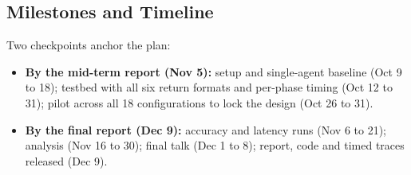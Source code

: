 \documentclass[11pt]{article}
\begin{document}
\subsection{Milestones and Timeline}
Two checkpoints anchor the plan:
\begin{itemize}
  \item \textbf{By the mid-term report (Nov 5):} setup and single-agent baseline (Oct 9 to 18); testbed with all six return formats and per-phase timing (Oct 12 to 31); pilot across all 18 configurations to lock the design (Oct 26 to 31).
  \item \textbf{By the final report (Dec 9):} accuracy and latency runs (Nov 6 to 21); analysis (Nov 16 to 30); final talk (Dec 1 to 8); report, code and timed traces released (Dec 9).
\end{itemize}



\end{document}
